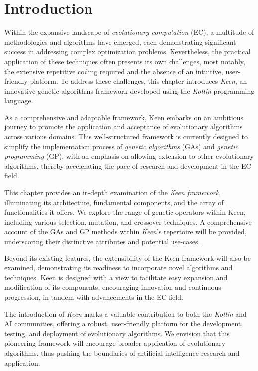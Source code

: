 \section{Introduction}
\label{sec:introduction}
  Within the expansive landscape of \textit{evolutionary computation} (EC), a
  multitude of methodologies and algorithms have emerged, each demonstrating
  significant success in addressing complex optimization problems.
  Nevertheless, the practical application of these techniques often presents
  its own challenges, most notably, the extensive repetitive coding required
  and the absence of an intuitive, user-friendly platform.
  To address these challenges, this chapter introduces \emph{Keen}, an
  innovative genetic algorithms framework developed using the \textit{Kotlin}
  programming language.

  As a comprehensive and adaptable framework, Keen embarks on an ambitious
  journey to promote the application and acceptance of evolutionary algorithms
  across various domains.
  This well-structured framework is currently designed to simplify the
  implementation process of \textit{genetic algorithms} (GAs) and
  \textit{genetic programming} (GP), with an emphasis on allowing extension to
  other evolutionary algorithms, thereby accelerating the pace of research
  and development in the EC field.

  This chapter provides an in-depth examination of the \textit{Keen
  framework}, illuminating its architecture, fundamental components, and the
  array of functionalities it offers.
  We explore the range of genetic operators within Keen, including various
  selection, mutation, and crossover techniques.
  A comprehensive account of the GAs and GP methods within \textit{Keen}'s
  repertoire will be provided, underscoring their distinctive attributes and
  potential use-cases.

  Beyond its existing features, the extensibility of the Keen framework will
  also be examined, demonstrating its readiness to incorporate novel
  algorithms and techniques.
  Keen is designed with a view to facilitate easy expansion and modification
  of its components, encouraging innovation and continuous progression, in
  tandem with advancements in the EC field.

  The introduction of \textit{Keen} marks a valuable contribution to both the
  \textit{Kotlin} and AI communities, offering a robust, user-friendly
  platform for the development, testing, and deployment of evolutionary
  algorithms.
  We envision that this pioneering framework will encourage broader
  application of evolutionary algorithms, thus pushing the boundaries of
  artificial intelligence research and application.

